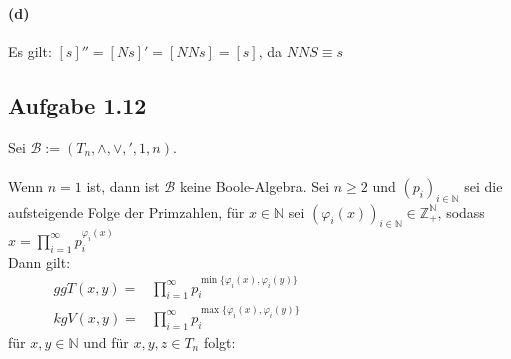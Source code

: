 \documentclass[10pt, a4paper]{article}
\begin{document}
\paragraph{(d)}
Es gilt: $[s]''=[Ns]'=[NNs]=[s]$, da $NNS\equiv s$

\subsection{Aufgabe 1.12}
Sei $\mathcal{B}:=(T_{n},\wedge,\vee,',1,n)$.	\\ \\
Wenn $n=1$ ist, dann ist $\mathcal{B}$ keine Boole-Algebra. Sei $n\geq2$ und $(p_{i})_{i\in\mathbb{N}}$ sei die aufsteigende Folge der Primzahlen, für $x\in\mathbb{N}$ sei $(\varphi_{i}(x))_{i\in\mathbb{N}}\in\mathbb{Z}^{\mathbb{N}}_{+}$, sodass $x=\prod_{i=1}^{\infty}p_{i}^{\varphi_{i}(x)}$	\\
Dann gilt:
\begin{align*}
	ggT(x,y)=&\prod_{i=1}^{\infty}p_{i}^{\min\{\varphi_{i}(x),\varphi_{i}(y)\}}	\hspace{2in}\\
	kgV(x,y)=&\prod_{i=1}^{\infty}p_{i}^{\max\{\varphi_{i}(x),\varphi_{i}(y)\}}
\end{align*}
für $x,y\in\mathbb{N}$ und für $x,y,z\in T_{n}$ folgt:
\end{document}
